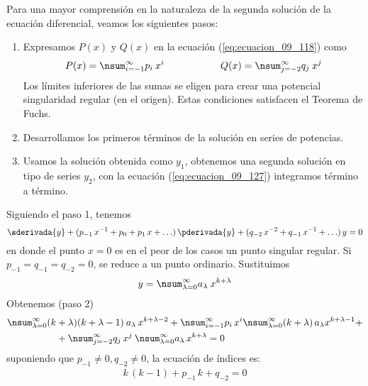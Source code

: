 Para una mayor comprensión en la naturaleza de la segunda solución de la ecuación diferencial, veamos los siguientes pasos:
\begin{enumerate}
\item Expresamos $P (x)$ y $Q (x)$ en la ecuación (\ref{eq:ecuacion_09_118}) como
\begin{align}
P (x) = \nsum_{i=-1}^{\infty} p_{i} \: x^{i} \hspace{2cm} Q (x) = \nsum_{j=-2}^{\infty} q_{j} \: x^{j}
\label{eq:ecuacion_09_129}
\end{align}
Los límites inferiores de las sumas se eligen para crear una potencial singularidad regular (en el origen). Estas condiciones satisfacen el Teorema de Fuchs.
\item Desarrollamos los primeros términos de la solución en series de potencias.
\item Usamos la solución obtenida como $y_{1}$, obtenemos una segunda solución en tipo de series $y_{2}$, con la ecuación (\ref{eq:ecuacion_09_127}) integramos término a término.
\end{enumerate}
Siguiendo el paso 1, tenemos
\begin{equation}
\sderivada{y} + (p_{-1} \, x^{-1} + p_{0} + p_{1} \, x + \ldots) \, \pderivada{y} + (q_{-2} \, x^{-2} + q_{-1} \, x^{-1} + \ldots) \, y = 0
\label{eq:ecuacion_09_130}
\end{equation}
en donde el punto $x = 0$ es en el peor de los casos un punto singular regular. Si $p_{-1} = q_{-1} = q_{-2} = 0$, se reduce a un punto ordinario. Sustituimos
\begin{align*}
y = \nsum_{\lambda = 0}^{\infty} a_{\lambda} \: x^{k + \lambda}
\end{align*}
Obtenemos (paso 2)
\begin{align}
\begin{aligned}
\nsum_{\lambda=0}^{\infty} (k &+ \lambda)(k + \lambda - 1) \: a_{\lambda} \, x^{k + \lambda - 2} + \nsum_{i=-1}^{\infty} p_{i} \, x^{i} \nsum_{\lambda=0}^{\infty} (k + \lambda) \,  a_{\lambda} x^{k + \lambda - 1} + \\
&+ \nsum_{j=-2}^{\infty} q_{j} \, x^{j} \: \nsum_{\lambda=0}^{\infty} a_{\lambda} \, x^{k + \lambda} = 0
\end{aligned}
\label{eq:ecuacion_09_131}
\end{align}
suponiendo que $p_{-1} \neq 0, q_{-2} \neq 0$, la ecuación de índices es:
\begin{align*}
k \, (k - 1) + p_{-1} \, k + q_{-2} = 0
\end{align*}
